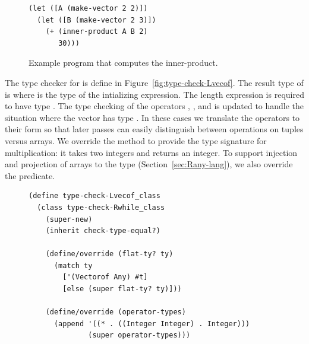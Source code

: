 \documentclass[7x10,nocrop]{TimesAPriori_MIT}%
\begin{document}
{\begin{figure}[tp]
\begin{lstlisting}
(let ([A (make-vector 2 2)])
  (let ([B (make-vector 2 3)])
    (+ (inner-product A B 2)
       30)))
\end{lstlisting}
\caption{Example program that computes the inner-product.}
\label{fig:inner-product}
\end{figure}


The type checker for \LangArray{} is define in
Figure~\ref{fig:type-check-Lvecof}. The result type of
 is  where  is the type
of the intializing expression.  The length expression is required to
have type . The type checking of the operators
, , and   is
updated to handle the situation where the vector has type
. In these cases we translate the operators to their
 form so that later passes can easily distinguish
between operations on tuples versus arrays. We override the
 method to provide the type signature for
multiplication: it takes two integers and returns an integer.  To
support injection and projection of arrays to the  type
(Section~\ref{sec:Rany-lang}), we also override the 
predicate.

\begin{figure}[tbp]
\begin{lstlisting}[basicstyle=\ttfamily\footnotesize]
(define type-check-Lvecof_class
  (class type-check-Rwhile_class
    (super-new)
    (inherit check-type-equal?)

    (define/override (flat-ty? ty)
      (match ty
        ['(Vectorof Any) #t]
        [else (super flat-ty? ty)]))
    
    (define/override (operator-types)
      (append '((* . ((Integer Integer) . Integer)))
              (super operator-types)))
    

\end{lstlisting}
\end{figure}}
\end{document}
